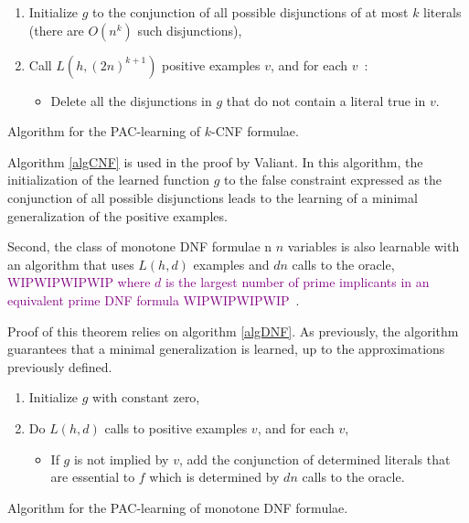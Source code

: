 \documentclass{llncs}
\newcommand{\wip}[1]{\textcolor{Purple}{WIPWIPWIPWIP #1 WIPWIPWIPWIP}}
\begin{document}
\begin{algorithm}
\begin{enumerate}
  \item Initialize $g$ to the conjunction of all possible disjunctions of at most $k$ literals (there are $O(n^k)$ such disjunctions),
\item Call $L(h,(2n)^{k+1})$ positive examples $v$, and for each $v$~:
\begin{itemize}
\item Delete all the disjunctions in $g$ that do not contain a literal true in $v$.	
\end{itemize}

\end{enumerate}
\caption{Algorithm for the PAC-learning of $k$-CNF formulae.\label{algCNF}}
\end{algorithm}

Algorithm \ref{algCNF} is used in the proof by Valiant. In this algorithm, the initialization of the learned function $g$ to the false constraint expressed as the conjunction of all possible disjunctions
leads to the learning of a minimal  generalization of the positive examples.


\begin{theorem}\label{thm:mdnf}
    Second, the class of monotone DNF formulae n $n$ variables is also learnable with an
    algorithm that uses $L(h,d)$ examples and $d n$ calls to the oracle,
    \wip{where $d$ is the largest number of prime implicants in an equivalent prime DNF formula}~\cite{Valiant84cacm}.
\end{theorem}

Proof of this theorem relies on algorithm \ref{algDNF}. As previously, the algorithm guarantees that a minimal generalization is learned, up to the approximations previously defined.

\begin{algorithm}
\begin{enumerate}
\item Initialize $g$ with constant zero,
\item
Do $L(h,d)$ calls to positive examples $v$, and for each $v$,
\begin{itemize}
	\item 
	If $g$ is not implied by $v$, add the conjunction of determined literals that
	are essential to $f$ which is determined by $d n$ calls to the oracle.
\end{itemize}
\end{enumerate}
\caption{Algorithm for the PAC-learning of monotone DNF formulae.\label{algDNF}}
\end{algorithm}
\end{document}
